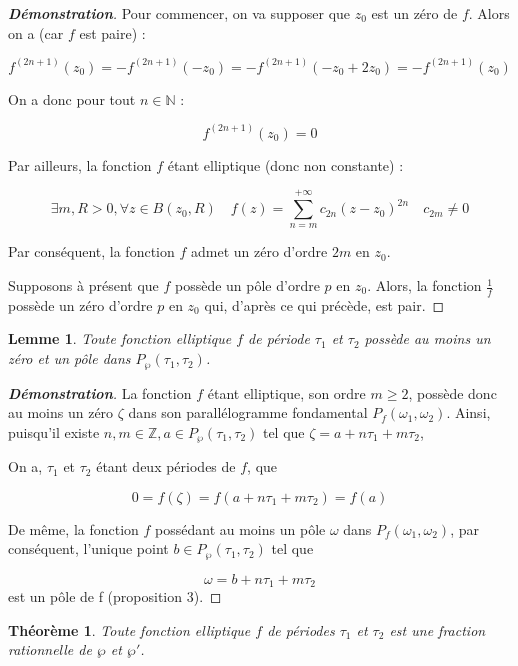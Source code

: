 \documentclass[12pt]{article}
\newtheorem{lemma}{Lemme}
\newtheorem{theorem}{Théorème}
\begin{document}
                    \begin{proof}[\textbf{Démonstration}]
                    Pour commencer, on va supposer que \(z_0\) est un zéro de \(f\). Alors on a (car \(f\) est paire) :

                    \[
                    f^{(2n+1)}(z_0) = -f^{(2n+1)}(-z_0) = -f^{(2n+1)}(-z_0 + 2z_0) = -f^{(2n+1)}(z_0)
                    \]

                    On a donc pour tout \(n \in \mathbb{N}\) :

                    \[
                    f^{(2n+1)}(z_0) = 0
                    \]

                    Par ailleurs, la fonction \(f\) étant elliptique (donc non constante) :

                    \[
                    \exists m, R > 0, \forall z \in B(z_0, R) \quad f(z) = \sum_{n=m}^{+\infty} c_{2n} (z - z_0)^{2n} \quad c_{2m} \neq 0
                    \]

                    Par conséquent, la fonction \(f\) admet un zéro d'ordre \(2m\) en \(z_0\).

                    Supposons à présent que \(f\) possède un pôle d'ordre \(p\) en \(z_0\). Alors, la fonction \(\frac{1}{f}\) possède un zéro d'ordre \(p\) en \(z_0\) qui, d'après ce qui précède, est pair.
                    \end{proof}

                    \begin{lemma}
                    Toute fonction elliptique \(f\) de période \(\tau_1\) et \(\tau_2\) possède au moins un zéro et un pôle dans \(P_{\wp}(\tau_1, \tau_2)\).
                    \end{lemma}

                    \begin{proof}[\textbf{Démonstration}]
                    La fonction \(f\) étant elliptique, son ordre \(m \geq 2\), possède donc au moins un zéro \(\zeta\) dans son parallélogramme fondamental \(P_f(\omega_1, \omega_2)\). Ainsi, puisqu'il existe \(n, m \in \mathbb{Z}, a \in P_{\wp}(\tau_1, \tau_2)\) tel que \(\zeta = a + n\tau_1 + m\tau_2\),

                    On a, \(\tau_1\) et \(\tau_2\) étant deux périodes de \(f\), que

                    \[
                    0 = f(\zeta) = f(a + n\tau_1 + m\tau_2) = f(a)
                    \]

                    De même, la fonction \(f\) possédant au moins un pôle \(\omega\) dans \(P_f(\omega_1, \omega_2)\), par conséquent, l'unique point \(b \in P_{\wp}(\tau_1, \tau_2)\) tel que

                    \[
                        \omega = b + n\tau_1 + m\tau_2
                    \]
                    est un pôle de f (proposition 3).
                \end{proof}
                \begin{theorem}
                    Toute fonction elliptique \(f\) de périodes \(\tau_1\) et \(\tau_2\) est une fraction rationnelle de \(\wp\) et \(\wp'\).
                    \end{theorem}
\end{document}
